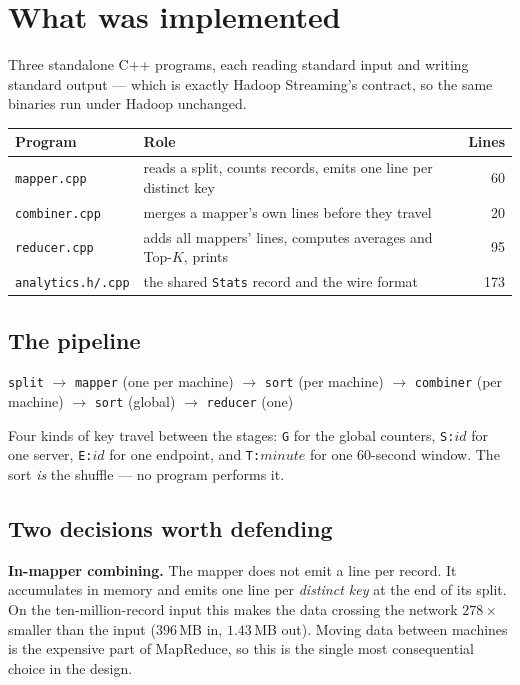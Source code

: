 \documentclass[11pt,a4paper]{article}
\begin{document}
\section{What was implemented}

Three standalone C++ programs, each reading standard input and writing standard
output --- which is exactly Hadoop Streaming's contract, so the same binaries
run under Hadoop unchanged.

\begin{center}\small
\begin{tabular}{@{}llr@{}}
\toprule
\textbf{Program} & \textbf{Role} & \textbf{Lines} \\
\midrule
\texttt{mapper.cpp} & reads a split, counts records, emits one line per distinct key & 60 \\
\texttt{combiner.cpp} & merges a mapper's own lines before they travel & 20 \\
\texttt{reducer.cpp} & adds all mappers' lines, computes averages and Top-$K$, prints & 95 \\
\texttt{analytics.h/.cpp} & the shared \texttt{Stats} record and the wire format & 173 \\
\bottomrule
\end{tabular}
\end{center}

\subsection{The pipeline}

\begin{center}\small
\texttt{split} $\rightarrow$ \texttt{mapper} (one per machine) $\rightarrow$
\texttt{sort} (per machine) $\rightarrow$ \texttt{combiner} (per machine)
$\rightarrow$ \texttt{sort} (global) $\rightarrow$ \texttt{reducer} (one)
\end{center}

Four kinds of key travel between the stages: \texttt{G} for the global
counters, \texttt{S:$id$} for one server, \texttt{E:$id$} for one endpoint, and
\texttt{T:$minute$} for one 60-second window. The sort \emph{is} the shuffle ---
no program performs it.

\subsection{Two decisions worth defending}

\textbf{In-mapper combining.} The mapper does not emit a line per record. It
accumulates in memory and emits one line per \emph{distinct key} at the end of
its split. On the ten-million-record input this makes the data crossing the
network $278\times$ smaller than the input ($396$\,MB in, $1.43$\,MB out).
Moving data between machines is the expensive part of MapReduce, so this is the
single most consequential choice in the design.
\end{document}
